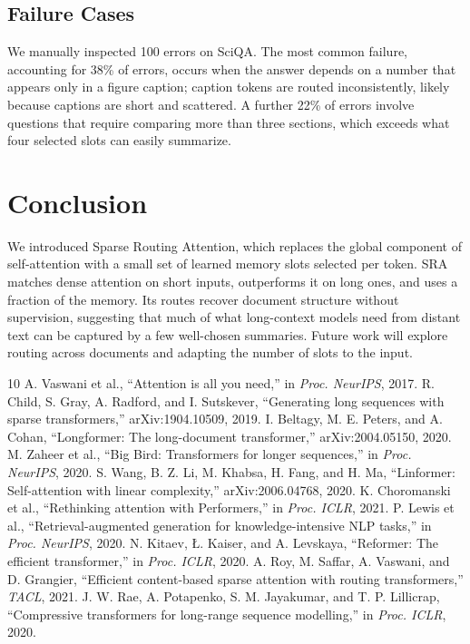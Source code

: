 \documentclass[conference,letterpaper]{IEEEtran}
\begin{document}
\subsection{Failure Cases}

We manually inspected 100 errors on SciQA. The most common failure, accounting for 38\% of errors, occurs when the answer depends on a number that appears only in a figure caption; caption tokens are routed inconsistently, likely because captions are short and scattered. A further 22\% of errors involve questions that require comparing more than three sections, which exceeds what four selected slots can easily summarize.

\section{Conclusion}

We introduced Sparse Routing Attention, which replaces the global component of self-attention with a small set of learned memory slots selected per token. SRA matches dense attention on short inputs, outperforms it on long ones, and uses a fraction of the memory. Its routes recover document structure without supervision, suggesting that much of what long-context models need from distant text can be captured by a few well-chosen summaries. Future work will explore routing across documents and adapting the number of slots to the input.

\begin{thebibliography}{10}
 A. Vaswani et al., ``Attention is all you need,'' in \textit{Proc. NeurIPS}, 2017.
 R. Child, S. Gray, A. Radford, and I. Sutskever, ``Generating long sequences with sparse transformers,'' arXiv:1904.10509, 2019.
 I. Beltagy, M. E. Peters, and A. Cohan, ``Longformer: The long-document transformer,'' arXiv:2004.05150, 2020.
 M. Zaheer et al., ``Big Bird: Transformers for longer sequences,'' in \textit{Proc. NeurIPS}, 2020.
 S. Wang, B. Z. Li, M. Khabsa, H. Fang, and H. Ma, ``Linformer: Self-attention with linear complexity,'' arXiv:2006.04768, 2020.
 K. Choromanski et al., ``Rethinking attention with Performers,'' in \textit{Proc. ICLR}, 2021.
 P. Lewis et al., ``Retrieval-augmented generation for knowledge-intensive NLP tasks,'' in \textit{Proc. NeurIPS}, 2020.
 N. Kitaev, {\L}. Kaiser, and A. Levskaya, ``Reformer: The efficient transformer,'' in \textit{Proc. ICLR}, 2020.
 A. Roy, M. Saffar, A. Vaswani, and D. Grangier, ``Efficient content-based sparse attention with routing transformers,'' \textit{TACL}, 2021.
 J. W. Rae, A. Potapenko, S. M. Jayakumar, and T. P. Lillicrap, ``Compressive transformers for long-range sequence modelling,'' in \textit{Proc. ICLR}, 2020.
\end{thebibliography}
\end{document}

